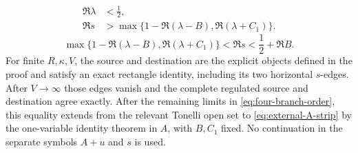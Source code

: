 \begin{proposition}
\begin{equation}
 \begin{aligned}
 \Re\lambda&<\frac12,\\
 \Re s&>\max\{1-\Re(\lambda-B),\Re(\lambda+C_1)\}.
 \end{aligned}
\end{equation}
\begin{equation}\label{eq:dual-tonelli}
 \max\{1-\Re(\lambda-B),\Re(\lambda+C_1)\}
 <\Re s<\frac12+\Re B.
\end{equation}
For finite $R,\kappa,V$, the source and destination are the explicit objects
defined in the proof and satisfy an exact rectangle identity, including its
two horizontal $s$-edges.  After $V\to\infty$ those edges vanish and the
complete regulated source and destination agree exactly.  After the remaining
limits in \eqref{eq:four-branch-order}, this equality extends from the relevant
Tonelli open set to \eqref{eq:external-A-strip} by the one-variable identity
theorem in $A$, with $B,C_1$ fixed.  No continuation in the separate symbols
$A+u$ and $s$ is used.
\end{proposition}

